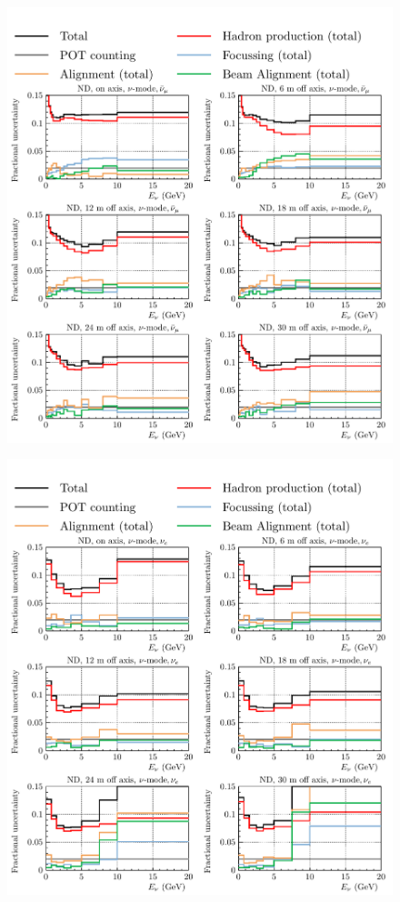 \documentclass{article}
\begin{document}
\begin{figure}
  \includegraphics[width=\textwidth]{plots/fracerrs/numode_numubar_ErrType_OffAxis}
  \caption{}
  \label{fig:grp_nu_numubar_offaxis}
\end{figure}

\begin{figure}
  \includegraphics[width=\textwidth]{plots/fracerrs/numode_nue_ErrType_OffAxis}
  \caption{}
  \label{fig:grp_nu_nue_offaxis}
\end{figure}
\end{document}
